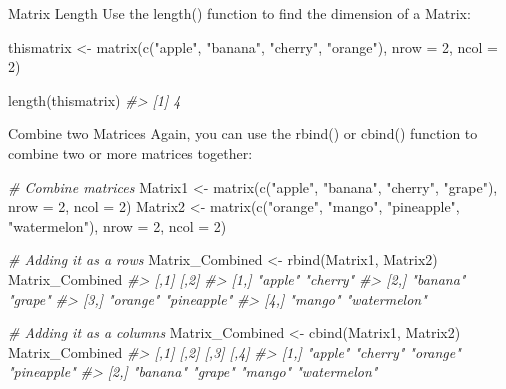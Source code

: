 \documentclass[
]{book}
\newenvironment{Shaded}{\begin{snugshade}}{\end{snugshade}}
\newcommand{\AttributeTok}[1]{\textcolor[rgb]{0.77,0.63,0.00}{#1}}
\newcommand{\CommentTok}[1]{\textcolor[rgb]{0.56,0.35,0.01}{\textit{#1}}}
\newcommand{\DecValTok}[1]{\textcolor[rgb]{0.00,0.00,0.81}{#1}}
\newcommand{\FunctionTok}[1]{\textcolor[rgb]{0.00,0.00,0.00}{#1}}
\newcommand{\NormalTok}[1]{#1}
\newcommand{\OtherTok}[1]{\textcolor[rgb]{0.56,0.35,0.01}{#1}}
\newcommand{\StringTok}[1]{\textcolor[rgb]{0.31,0.60,0.02}{#1}}
\begin{document}
Matrix Length
Use the length() function to find the dimension of a Matrix:

\begin{Shaded}
\begin{Highlighting}[]
\NormalTok{thismatrix }\OtherTok{\textless{}{-}} \FunctionTok{matrix}\NormalTok{(}\FunctionTok{c}\NormalTok{(}\StringTok{"apple"}\NormalTok{, }\StringTok{"banana"}\NormalTok{, }\StringTok{"cherry"}\NormalTok{, }\StringTok{"orange"}\NormalTok{), }\AttributeTok{nrow =} \DecValTok{2}\NormalTok{, }\AttributeTok{ncol =} \DecValTok{2}\NormalTok{)}

\FunctionTok{length}\NormalTok{(thismatrix)}
\CommentTok{\#\textgreater{} [1] 4}
\end{Highlighting}
\end{Shaded}

Combine two Matrices
Again, you can use the rbind() or cbind() function to combine two or more matrices together:

\begin{Shaded}
\begin{Highlighting}[]
\CommentTok{\# Combine matrices}
\NormalTok{Matrix1 }\OtherTok{\textless{}{-}} \FunctionTok{matrix}\NormalTok{(}\FunctionTok{c}\NormalTok{(}\StringTok{"apple"}\NormalTok{, }\StringTok{"banana"}\NormalTok{, }\StringTok{"cherry"}\NormalTok{, }\StringTok{"grape"}\NormalTok{), }\AttributeTok{nrow =} \DecValTok{2}\NormalTok{, }\AttributeTok{ncol =} \DecValTok{2}\NormalTok{)}
\NormalTok{Matrix2 }\OtherTok{\textless{}{-}} \FunctionTok{matrix}\NormalTok{(}\FunctionTok{c}\NormalTok{(}\StringTok{"orange"}\NormalTok{, }\StringTok{"mango"}\NormalTok{, }\StringTok{"pineapple"}\NormalTok{, }\StringTok{"watermelon"}\NormalTok{), }\AttributeTok{nrow =} \DecValTok{2}\NormalTok{, }\AttributeTok{ncol =} \DecValTok{2}\NormalTok{)}

\CommentTok{\# Adding it as a rows}
\NormalTok{Matrix\_Combined }\OtherTok{\textless{}{-}} \FunctionTok{rbind}\NormalTok{(Matrix1, Matrix2)}
\NormalTok{Matrix\_Combined}
\CommentTok{\#\textgreater{}      [,1]     [,2]        }
\CommentTok{\#\textgreater{} [1,] "apple"  "cherry"    }
\CommentTok{\#\textgreater{} [2,] "banana" "grape"     }
\CommentTok{\#\textgreater{} [3,] "orange" "pineapple" }
\CommentTok{\#\textgreater{} [4,] "mango"  "watermelon"}

\CommentTok{\# Adding it as a columns}
\NormalTok{Matrix\_Combined }\OtherTok{\textless{}{-}} \FunctionTok{cbind}\NormalTok{(Matrix1, Matrix2)}
\NormalTok{Matrix\_Combined}
\CommentTok{\#\textgreater{}      [,1]     [,2]     [,3]     [,4]        }
\CommentTok{\#\textgreater{} [1,] "apple"  "cherry" "orange" "pineapple" }
\CommentTok{\#\textgreater{} [2,] "banana" "grape"  "mango"  "watermelon"}
\end{Highlighting}
\end{Shaded}
\end{document}
